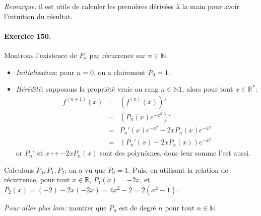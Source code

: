\textit{Remarque:} il est utile de calculer les premières dérivées à la main pour avoir l'intuition du résultat.

\paragraph{Exercice 150.} Montrons l'existence de $P_n$ par récurrence sur $n\in\mathbb{N}$.
\begin{itemize}
  \item \textit{Initialisation}: pour $n=0$, on a clairement $P_0=1$.
  \item \textit{Hérédité}: supposons la propriété vraie au rang $n\in \mathbb{N}1$, alors pour tout $x \in \mathbb{R}^*$:
  \begin{eqnarray}
    f^{(n+1)}(x) &=& \left( f^{(n)}(x) \right)'  \nonumber \\
                &=& \left( P_n(x)e^{-x^2} \right)'  \nonumber \\
                &=& P_n'(x)e^{-x^2}-2xP_n(x)e^{-x^2}  \nonumber \\
                &=& \left( P_n'(x) - 2xP_n(x) \right)e^{-x^2} \nonumber 
  \end{eqnarray}
  or $P_n'$ et $x\mapsto-2xP_n(x)$ sont des polynômes, donc leur somme l'est aussi.
\end{itemize}
Calculons $P_0,P_1,P_2$: on a vu que $P_0=1$. Puis, en utilisant la relation de récurrence, pour tout $x\in\mathbb{R}$, $P_1(x)=-2x$, et $P_2(x)=(-2)-2x(-2x)=4x^2-2=2(x^2-1)$.

\textit{Pour aller plus loin:} montrer que $P_n$ est de degré $n$ pour tout $n\in\mathbb{N}$.
